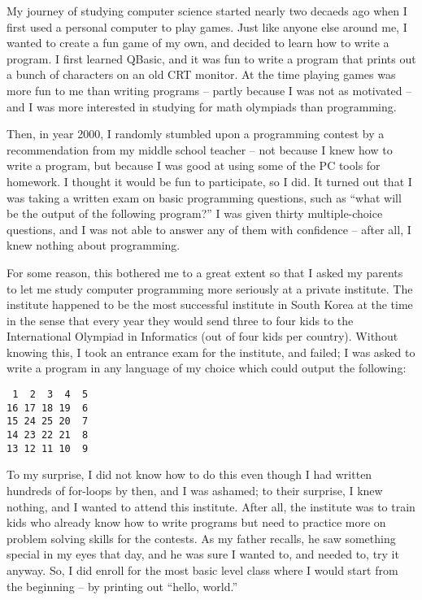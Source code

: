 
My journey of studying computer science started nearly two decaeds ago when I first used a personal computer to play games. Just like anyone else around me, I wanted to create a fun game of my own, and decided to learn how to write a program. I first learned QBasic, and it was fun to write a program that prints out a bunch of characters on an old CRT monitor. At the time playing games was more fun to me than writing programs -- partly because I was not as motivated -- and I was more interested in studying for math olympiads than programming.

Then, in year 2000, I randomly stumbled upon a programming contest by a recommendation from my middle school teacher -- not because I knew how to write a program, but because I was good at using some of the PC tools for homework. I thought it would be fun to participate, so I did. It turned out that I was taking a written exam on basic programming questions, such as ``what will be the output of the following program?'' I was given thirty multiple-choice questions, and I was not able to answer any of them with confidence  -- after all, I knew nothing about programming.

For some reason, this bothered me to a great extent so that I asked my parents to let me study computer programming more seriously at a private institute. The institute happened to be the most successful institute in South Korea at the time in the sense that every year they would send three to four kids to the International Olympiad in Informatics (out of four kids per country). Without knowing this, I took an entrance exam for the institute, and failed; I was asked to write a program in any language of my choice which could output the following:

\begin{verbatim}
 1  2  3  4  5
16 17 18 19  6
15 24 25 20  7
14 23 22 21  8
13 12 11 10  9
\end{verbatim}

To my surprise, I did not know how to do this even though I had written hundreds of for-loops by then, and I was ashamed; to their surprise, I knew nothing, and I wanted to attend this institute. After all, the institute was to train kids who already know how to write programs but need to practice more on problem solving skills for the contests. As my father recalls, he saw something special in my eyes that day, and he was sure I wanted to, and needed to, try it anyway. So, I did enroll for the most basic level class where I would start from the beginning -- by printing out ``hello, world.'' 

